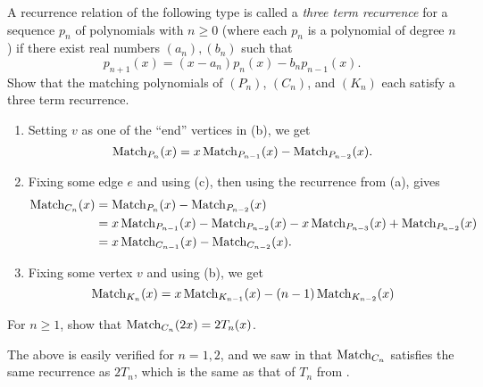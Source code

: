 	\begin{problem}
		\label{problem: three term recurrence matching}
		A recurrence relation of the following type is called a \emph{three term recurrence} for a sequence $p_n$ of polynomials with $n \ge 0$ (where each $p_n$ is a polynomial of degree $n$) if there exist real numbers $(a_n),(b_n)$ such that 
		\[ p_{n+1}(x) = (x-a_n)p_n(x) - b_n p_{n-1}(x). \]
		Show that the matching polynomials of $(P_n)$, $(C_n)$, and $(K_n)$ each satisfy a three term recurrence.
	\end{problem}
	\begin{solution*}
		\begin{enumerate}[label=(\alph*)]
			\item Setting $v$ as one of the ``end'' vertices in (b), we get
			\[ \operatorname{Match}_{P_n}(x) = x\operatorname{Match}_{P_{n-1}}(x) - \operatorname{Match}_{P_{n-2}}(x). \]

			\item Fixing some edge $e$ and using (c), then using the recurrence from (a), gives
			\begin{align*}
				\operatorname{Match}_{C_n}(x) &= \operatorname{Match}_{P_n}(x) - \operatorname{Match}_{P_{n-2}}(x) \\
					&= x\operatorname{Match}_{P_{n-1}}(x) - \operatorname{Match}_{P_{n-2}}(x) - x \operatorname{Match}_{P_{n-3}}(x) + \operatorname{Match}_{P_{n-2}}(x) \\
					&= x\operatorname{Match}_{C_{n-1}}(x) - \operatorname{Match}_{C_{n-2}}(x).
			\end{align*}

			\item Fixing some vertex $v$ and using (b), we get
			\[ \operatorname{Match}_{K_n}(x) = x\operatorname{Match}_{K_{n-1}}(x) - (n-1)\operatorname{Match}_{K_{n-2}}(x) \]
		\end{enumerate}
	\end{solution*}


	\begin{problem}
		For $n \ge 1$, show that $\operatorname{Match}_{C_n}(2x) = 2T_n(x)$.
	\end{problem}
	\begin{solution*}
		The above is easily verified for $n=1,2$, and we saw in  that $\operatorname{Match}_{C_n}$ satisfies the same recurrence as $2T_n$, which is the same as that of $T_n$ from \Cref{prop: recurrence of Tn}.
	\end{solution*}

